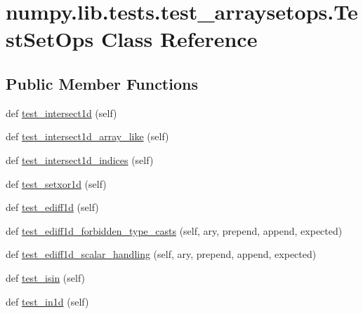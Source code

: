 \hypertarget{classnumpy_1_1lib_1_1tests_1_1test__arraysetops_1_1TestSetOps}{}\section{numpy.\+lib.\+tests.\+test\+\_\+arraysetops.\+Test\+Set\+Ops Class Reference}
\label{classnumpy_1_1lib_1_1tests_1_1test__arraysetops_1_1TestSetOps}
\subsection*{Public Member Functions}
\begin{DoxyCompactItemize}
\item 
def \hyperlink{classnumpy_1_1lib_1_1tests_1_1test__arraysetops_1_1TestSetOps_a12b3678ff8423146237cbbbe4431e049}{test\+\_\+intersect1d} (self)
\item 
def \hyperlink{classnumpy_1_1lib_1_1tests_1_1test__arraysetops_1_1TestSetOps_a2c0ad6256b1ae35e50ce9d3026fa360c}{test\+\_\+intersect1d\+\_\+array\+\_\+like} (self)
\item 
def \hyperlink{classnumpy_1_1lib_1_1tests_1_1test__arraysetops_1_1TestSetOps_a316521723f9da759a070d604231fd3eb}{test\+\_\+intersect1d\+\_\+indices} (self)
\item 
def \hyperlink{classnumpy_1_1lib_1_1tests_1_1test__arraysetops_1_1TestSetOps_a8235679d8e27b5976b040ffe04f28740}{test\+\_\+setxor1d} (self)
\item 
def \hyperlink{classnumpy_1_1lib_1_1tests_1_1test__arraysetops_1_1TestSetOps_a61a1b8bd83a476b523ac9b4007a8f7a9}{test\+\_\+ediff1d} (self)
\item 
def \hyperlink{classnumpy_1_1lib_1_1tests_1_1test__arraysetops_1_1TestSetOps_a6529ad54879dbb31f89e4d9b5d812b93}{test\+\_\+ediff1d\+\_\+forbidden\+\_\+type\+\_\+casts} (self, ary, prepend, append, expected)
\item 
def \hyperlink{classnumpy_1_1lib_1_1tests_1_1test__arraysetops_1_1TestSetOps_ae819666a3101232b8bbcc34eda4bccd6}{test\+\_\+ediff1d\+\_\+scalar\+\_\+handling} (self, ary, prepend, append, expected)
\item 
def \hyperlink{classnumpy_1_1lib_1_1tests_1_1test__arraysetops_1_1TestSetOps_a71f1d9e03deea888e305a4308c2cfcf4}{test\+\_\+isin} (self)
\item 
def \hyperlink{classnumpy_1_1lib_1_1tests_1_1test__arraysetops_1_1TestSetOps_a5b37999c7685259e1a67b6364b9445b6}{test\+\_\+in1d} (self)

\end{DoxyCompactItemize}
